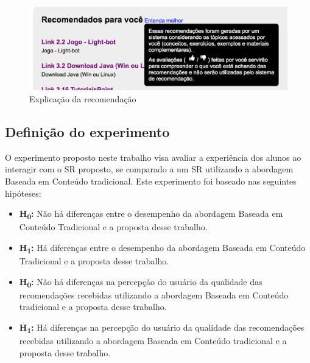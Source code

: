 \begin{figure}[htb]
  \caption{\label{fig:adaptweb-proposta-explicacao}Explicação da recomendação}
  \begin{center}
      \includegraphics[scale=0.6]{./Figuras/explicacao-das-recomendacoes.png}
  \end{center}
\end{figure}

\subsection{Definição do experimento}\label{subsection:definicao-experimento}

O experimento proposto neste trabalho visa avaliar a experiência dos alunos ao interagir com o SR proposto, se comparado a um SR
utilizando a abordagem Baseada em Conteúdo tradicional. Este experimento foi
baseado nas seguintes hipóteses:

\begin{itemize}
\item \textbf{H\textsubscript{0}:} Não há diferenças entre o desempenho da abordagem Baseada em Conteúdo
Tradicional e a proposta desse trabalho.
\item \textbf{H\textsubscript{1}:} Há diferenças entre o desempenho da abordagem Baseada em Conteúdo
Tradicional e a proposta desse trabalho.
\end{itemize}


\begin{itemize}
\item \textbf{H\textsubscript{0}:} Não há diferenças na percepção do usuário da qualidade das recomendações recebidas utilizando a abordagem
Baseada em Conteúdo tradicional e a proposta desse trabalho.
\item \textbf{H\textsubscript{1}:} Há diferenças na percepção do usuário da qualidade das recomendações recebidas utilizando a abordagem
Baseada em Conteúdo tradicional e a proposta desse trabalho.
\end{itemize}

